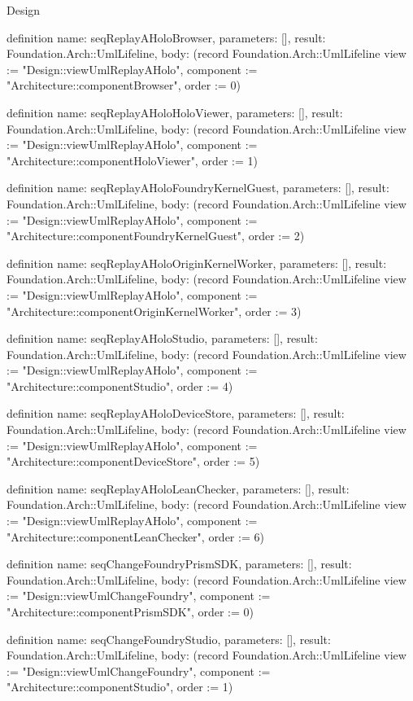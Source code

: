\begin{lexlean}{Design}
\begin{semanticmodule}
definition{
  name: seqReplayAHoloBrowser,
  parameters: [],
  result: Foundation.Arch::UmlLifeline,
  body: (record Foundation.Arch::UmlLifeline {view := "Design::viewUmlReplayAHolo", component := "Architecture::componentBrowser", order := 0})
}

definition{
  name: seqReplayAHoloHoloViewer,
  parameters: [],
  result: Foundation.Arch::UmlLifeline,
  body: (record Foundation.Arch::UmlLifeline {view := "Design::viewUmlReplayAHolo", component := "Architecture::componentHoloViewer", order := 1})
}

definition{
  name: seqReplayAHoloFoundryKernelGuest,
  parameters: [],
  result: Foundation.Arch::UmlLifeline,
  body: (record Foundation.Arch::UmlLifeline {view := "Design::viewUmlReplayAHolo", component := "Architecture::componentFoundryKernelGuest", order := 2})
}

definition{
  name: seqReplayAHoloOriginKernelWorker,
  parameters: [],
  result: Foundation.Arch::UmlLifeline,
  body: (record Foundation.Arch::UmlLifeline {view := "Design::viewUmlReplayAHolo", component := "Architecture::componentOriginKernelWorker", order := 3})
}

definition{
  name: seqReplayAHoloStudio,
  parameters: [],
  result: Foundation.Arch::UmlLifeline,
  body: (record Foundation.Arch::UmlLifeline {view := "Design::viewUmlReplayAHolo", component := "Architecture::componentStudio", order := 4})
}

definition{
  name: seqReplayAHoloDeviceStore,
  parameters: [],
  result: Foundation.Arch::UmlLifeline,
  body: (record Foundation.Arch::UmlLifeline {view := "Design::viewUmlReplayAHolo", component := "Architecture::componentDeviceStore", order := 5})
}

definition{
  name: seqReplayAHoloLeanChecker,
  parameters: [],
  result: Foundation.Arch::UmlLifeline,
  body: (record Foundation.Arch::UmlLifeline {view := "Design::viewUmlReplayAHolo", component := "Architecture::componentLeanChecker", order := 6})
}

definition{
  name: seqChangeFoundryPrismSDK,
  parameters: [],
  result: Foundation.Arch::UmlLifeline,
  body: (record Foundation.Arch::UmlLifeline {view := "Design::viewUmlChangeFoundry", component := "Architecture::componentPrismSDK", order := 0})
}

definition{
  name: seqChangeFoundryStudio,
  parameters: [],
  result: Foundation.Arch::UmlLifeline,
  body: (record Foundation.Arch::UmlLifeline {view := "Design::viewUmlChangeFoundry", component := "Architecture::componentStudio", order := 1})
}


\end{semanticmodule}
\end{lexlean}
